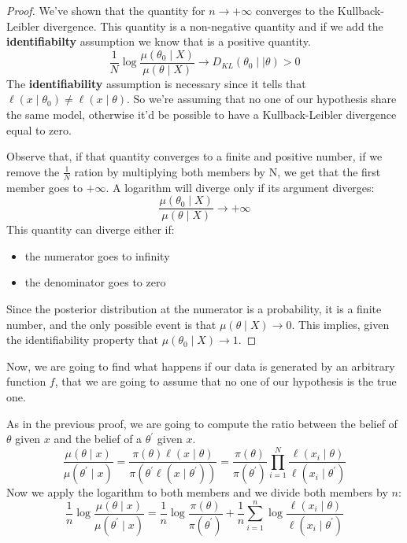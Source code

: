 \begin{proof}
    We've shown that the quantity for $n \to +\infty$ converges to the Kullback-Leibler divergence. This quantity is a non-negative quantity and if we add the \textbf{identifiabilty} assumption we know that is a positive quantity.
    \[
        \frac{1}{N} \log\frac{\mu(\theta_0 \mid X)}{\mu(\theta \mid X)} \to D_{KL} (\theta_0 \mid \mid \theta) > 0
    \]
    The \textbf{identifiability} assumption is necessary since it tells that $\ell(x\mid \theta_0) \neq \ell(x \mid \theta)$. So we're assuming that no one of our hypothesis share the same model, otherwise it'd be possible to have a Kullback-Leibler divergence equal to zero.

    Observe that, if that quantity converges to a finite and positive number, if we remove the $\frac 1N$ ration by multiplying both members by N, we get that the first member goes to $+\infty$.
    A logarithm will diverge only if its argument diverges:
    \[
        \frac{\mu(\theta_0 \mid X)}{\mu(\theta \mid X)} \to +\infty
    \]
    This quantity can diverge either if:
    \begin{itemize}
        \item the numerator goes to infinity
        \item the denominator goes to zero
    \end{itemize}

    Since the posterior distribution at the numerator is a probability, it is a finite number, and the only possible event is that $\mu(\theta\mid X) \to 0 $. This implies, given the identifiability property that $\mu(\theta_0 \mid X) \to 1$.
\end{proof}


Now, we are going to find what happens if our data is generated by an arbitrary function $f$, that we are going to assume that no one of our hypothesis is the true one.

As in the previous proof, we are going to compute the ratio between the belief of $\theta$ given $x$ and the belief of a $\theta^{\prime}$ given $x$.
\[
    \frac{\mu(\theta \mid x)}{\mu(\theta^{\prime} \mid x)} = \frac{\pi(\theta) \ell(x \mid \theta)}{\pi(\theta^{\prime} \ell(x \mid \theta^{\prime} ))} = \frac{\pi(\theta)}{\pi(\theta^{\prime} )} \prod_{i=1}^N \frac{\ell(x_i \mid \theta)}{\ell(x_i \mid \theta^{\prime} )}
\]
Now we apply the logarithm to both members and we divide both members by $n$:
\[
    \frac{1}{n} \log \frac{\mu(\theta \mid x)}{\mu(\theta^{\prime} \mid x)} = \frac{1}{n} \log \frac{\pi(\theta)}{\pi(\theta^{\prime} )} +  \frac{1}{n} \sum_{i=1}^n \log \frac{\ell(x_i \mid \theta)}{\ell(x_i \mid \theta^{\prime} )}
\]

